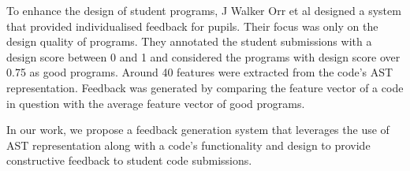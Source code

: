 To enhance the design of student programs, J Walker Orr et al \cite{T} designed a system that provided individualised feedback for pupils. Their
focus was only on the design quality of programs. They annotated the
student submissions with a design score between 0 and 1 and considered the programs with design score over
0.75 as good programs. Around 40 features were extracted from
the code's AST representation. Feedback was generated by
comparing the feature vector of a code in question with the
average feature vector of good programs.

In our work, we propose a feedback generation system that
leverages the use of AST representation along with a code's
functionality and design to provide constructive feedback to
student code submissions.


 




